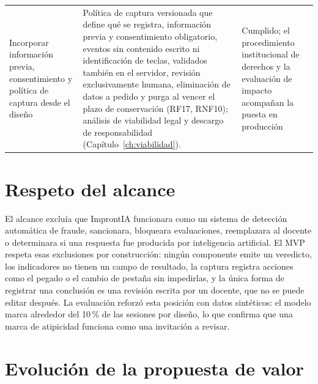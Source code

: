 {\begin{longtable}{>{\raggedright\arraybackslash}p{3.6cm} >{\raggedright\arraybackslash}p{7.4cm} >{\raggedright\arraybackslash}p{2.6cm}}
    Incorporar información previa, consentimiento y política de captura desde el diseño & Política de captura versionada que define qué se registra, información previa y consentimiento obligatorio, eventos sin contenido escrito ni identificación de teclas, validados también en el servidor, revisión exclusivamente humana, eliminación de datos a pedido y purga al vencer el plazo de conservación (RF17, RNF10); análisis de viabilidad legal y descargo de responsabilidad (Capítulo~\ref{ch:viabilidad}). & Cumplido; el procedimiento institucional de derechos y la evaluación de impacto acompañan la puesta en producción \\
\end{longtable}
}

\section{Respeto del alcance}
\label{sec:concl_alcance}

El alcance excluía que ImprontIA funcionara como un sistema de detección automática de fraude, sancionara, bloqueara evaluaciones, reemplazara al docente o determinara si una respuesta fue producida por inteligencia artificial. El MVP respeta esas exclusiones por construcción: ningún componente emite un veredicto, los indicadores no tienen un campo de resultado, la captura registra acciones como el pegado o el cambio de pestaña sin impedirlas, y la única forma de registrar una conclusión es una revisión escrita por un docente, que no se puede editar después. La evaluación reforzó esta posición con datos sintéticos: el modelo marca alrededor del 10\,\% de las sesiones por diseño, lo que confirma que una marca de atipicidad funciona como una invitación a revisar.

\section{Evolución de la propuesta de valor}
\label{sec:concl_evolucion}

